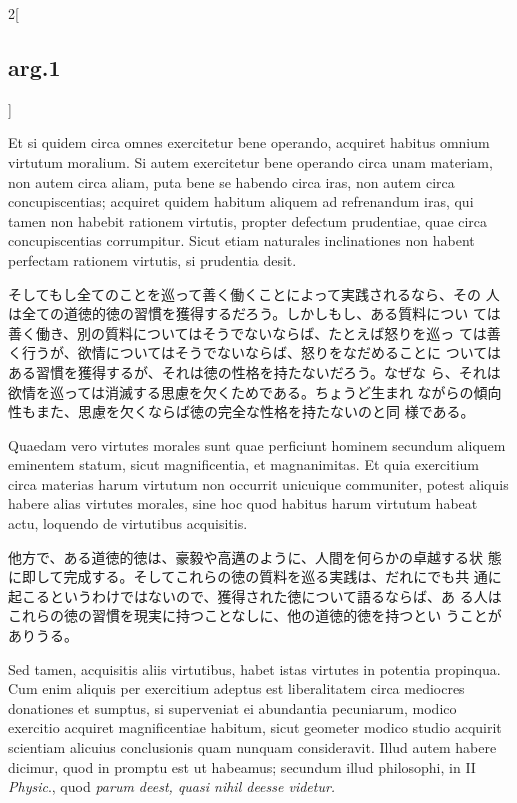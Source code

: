 \documentclass[paper=a4paper,fontsize=10pt,jafontsize=9pt,titlepage]{jlreq}
\begin{document}
\begin{paracol}{2}[\subsection{arg.1}]
\switchcolumn*

Et si quidem circa omnes exercitetur bene operando, acquiret habitus
omnium virtutum moralium. Si autem exercitetur bene operando circa
unam materiam, non autem circa aliam, puta bene se habendo circa iras,
non autem circa concupiscentias; acquiret quidem habitum aliquem ad
refrenandum iras, qui tamen non habebit rationem virtutis, propter
defectum prudentiae, quae circa concupiscentias corrumpitur. Sicut
etiam naturales inclinationes non habent perfectam rationem virtutis,
si prudentia desit.

\switchcolumn

そしてもし全てのことを巡って善く働くことによって実践されるなら、その
 人は全ての道徳的徳の習慣を獲得するだろう。しかしもし、ある質料につい
 ては善く働き、別の質料についてはそうでないならば、たとえば怒りを巡っ
 ては善く行うが、欲情についてはそうでないならば、怒りをなだめることに
 ついてはある習慣を獲得するが、それは徳の性格を持たないだろう。なぜな
 ら、それは欲情を巡っては消滅する思慮を欠くためである。ちょうど生まれ
 ながらの傾向性もまた、思慮を欠くならば徳の完全な性格を持たないのと同
 様である。

\switchcolumn*

Quaedam vero virtutes morales sunt quae perficiunt hominem secundum
aliquem eminentem statum, sicut magnificentia, et magnanimitas. Et
quia exercitium circa materias harum virtutum non occurrit unicuique
communiter, potest aliquis habere alias virtutes morales, sine hoc
quod habitus harum virtutum habeat actu, loquendo de virtutibus
acquisitis.

\switchcolumn

他方で、ある道徳的徳は、豪毅や高邁のように、人間を何らかの卓越する状
 態に即して完成する。そしてこれらの徳の質料を巡る実践は、だれにでも共
 通に起こるというわけではないので、獲得された徳について語るならば、あ
 る人はこれらの徳の習慣を現実に持つことなしに、他の道徳的徳を持つとい
 うことがありうる。

\switchcolumn*

Sed tamen, acquisitis aliis virtutibus, habet istas virtutes in
potentia propinqua. Cum enim aliquis per exercitium adeptus est
liberalitatem circa mediocres donationes et sumptus, si superveniat ei
abundantia pecuniarum, modico exercitio acquiret magnificentiae
habitum, sicut geometer modico studio acquirit scientiam alicuius
conclusionis quam nunquam consideravit. Illud autem habere dicimur,
quod in promptu est ut habeamus; secundum illud philosophi, in II
{\itshape Physic}., quod {\itshape parum deest, quasi nihil deesse
videtur.}


\end{paracol}
\end{document}
